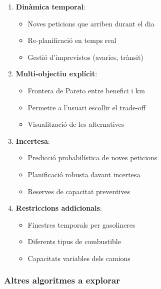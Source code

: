 \begin{enumerate}
    \item \textbf{Dinàmica temporal}:
    \begin{itemize}
        \item Noves peticions que arriben durant el dia
        \item Re-planificació en temps real
        \item Gestió d'imprevistos (avaries, trànsit)
    \end{itemize}
    
    \item \textbf{Multi-objectiu explícit}:
    \begin{itemize}
        \item Frontera de Pareto entre benefici i km
        \item Permetre a l'usuari escollir el trade-off
        \item Visualització de les alternatives
    \end{itemize}
    
    \item \textbf{Incertesa}:
    \begin{itemize}
        \item Predicció probabilística de noves peticions
        \item Planificació robusta davant incertesa
        \item Reserves de capacitat preventives
    \end{itemize}
    
    \item \textbf{Restriccions addicionals}:
    \begin{itemize}
        \item Finestres temporals per gasolineres
        \item Diferents tipus de combustible
        \item Capacitats variables dels camions
    \end{itemize}
\end{enumerate}

\subsubsection{Altres algoritmes a explorar}

